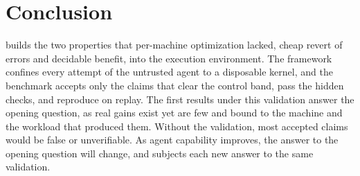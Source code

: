 \section{Conclusion}

\sys builds the two properties that per-machine optimization lacked, cheap revert of errors and decidable benefit, into the execution environment.
The framework confines every attempt of the untrusted agent to a disposable kernel, and the benchmark accepts only the claims that clear the control band, pass the hidden checks, and reproduce on replay.
The first results under this validation answer the opening question, as real gains exist yet are few and bound to the machine and the workload that produced them.
Without the validation, most accepted claims would be false or unverifiable.
As agent capability improves, the answer to the opening question will change, and \sys subjects each new answer to the same validation.
